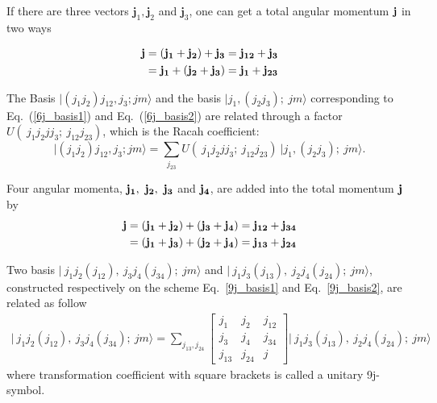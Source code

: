 \documentclass[12pt,a4paper,twoside]{article}
\begin{document}
If there are three vectors $\mathbf{j}_1, \mathbf{j}_2$ and $\mathbf{j}_3$, one can get a total angular momentum $\bf j$ in two ways

\begin{align}
\label{6j_basis1}
\bf j & =\bf \left( j_1 + j_2 \right) + j_3 = j_{12} + j_3 \\
\label{6j_basis2}		
& = \bf j_1 + \left( j_2  + j_3 \right) = j_1 +j_{23}
\end{align}

The Basis $ \vert (j_1 j_2)j_{12},j_3; jm \rangle$ and the basis $\vert j_1,(j_2 j_3); ~jm \rangle$ corresponding to Eq.~(\ref{6j_basis1}) and Eq.~(\ref{6j_basis2}) are related through a factor $U(~j_1 j_2 j j_3;~ j_{12} j_{23})$, which is the Racah coefficient:
\begin{equation}
\vert (j_1 j_2)j_{12},j_3; jm \rangle = \sum_{j_{23}} U(~j_1 j_2 j j_3;~ j_{12} j_{23}) ~ \vert j_1,(j_2 j_3); ~jm \rangle.
\end{equation}

Four angular momenta, $\bf j_1,~j_2,~j_3$ and $\bf j_4$, are added into the total momentum $\bf j$ by
\begin{align}
\label{9j_basis1}
\bf j & =\bf \left( j_1 + j_2 \right) + ( j_3 + j_4) = j_{12} + j_{34} \\
\label{9j_basis2}		
& = \bf ( j_1 + j_3 ) + \left( j_2  + j_4 \right) = j_{13} +j_{24}
\end{align}

Two basis  $\vert~ j_1 j_2 (j_{12}),~j_3 j_4 (j_{34});~jm \rangle$ and $\vert~ j_1 j_3 (j_{13}),~j_2 j_4 (j_{24});~jm \rangle $, constructed respectively on the scheme Eq.~\ref{9j_basis1} and Eq.~\ref{9j_basis2},  are related as follow
\begin{align}
\label{9j}
\vert~ j_1 j_2 (j_{12}),~j_3 j_4 (j_{34});~jm \rangle = \sum_{j_{13},j_{24}} 
\begin{bmatrix}
j_1 & j_2 & j_{12} \\ 
j_3 & j_4 & j_{34} \\ 
j_{13} & j_{24} & j
\end{bmatrix} 
\vert~ j_1 j_3 (j_{13}),~j_2 j_4 (j_{24});~jm \rangle 
\end{align}
where transformation coefficient with square brackets is called a unitary 9j-symbol.
\end{document}

